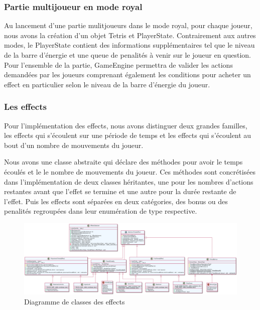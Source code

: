 \documentclass{article}
\begin{document}
\subsubsection{Partie multijoueur en mode royal}

Au lancement d'une partie mulitjoueurs dans le mode royal, pour chaque joueur, nous avons la création d'un objet Tetris et PlayerState. Contrairement aux autres modes, le PlayerState contient des informations supplémentaires tel que le niveau de la barre d'énergie et une queue de penalités à venir sur le joueur en question. Pour l'ensemble de la partie, GameEngine permettra de valider les actions demandées par les joueurs comprenant également les conditions pour acheter un effect en particulier selon le niveau de la barre d'énergie du joueur. 

\subsubsection*{Les effects}

Pour l'implémentation des effects, nous avons distinguer deux grandes familles, les effects qui s'écoulent sur une période de temps et les effects qui s'écoulent au bout d'un nombre de mouvements du joueur.

Nous avons une classe abstraite qui déclare des méthodes pour avoir le temps écoulés et le le nombre de mouvements du joueur. Ces méthodes sont concrétisées dans l'implémentation de deux classes héritantes, une pour les nombres d'actions restantes avant que l'effet se termine et une autre pour la durée restante de l'effet. Puis les effects sont séparées en deux catégories, des bonus ou des penalités regroupées dans leur enumération de type respective. 

\begin{figure}[H]
    \centering
    \includegraphics[scale=0.3, angle=90]{../res/uml/class/EffectClass.png}
    \caption{Diagramme de classes des effects}
    \label{fig:EffectDiagramm}
\end{figure}
\end{document}
